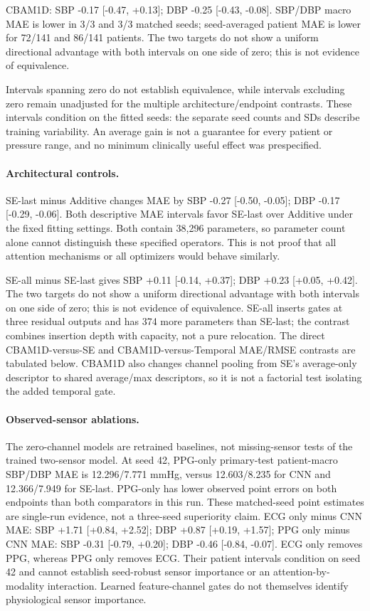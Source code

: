 \documentclass[11pt]{article}
\begin{document}
CBAM1D: SBP -0.17 [-0.47, +0.13]; DBP -0.25 [-0.43, -0.08]. SBP/DBP macro MAE is lower in 3/3 and 3/3 matched seeds; seed-averaged patient MAE is lower for 72/141 and 86/141 patients. The two targets do not show a uniform directional advantage with both intervals on one side of zero; this is not evidence of equivalence.

Intervals spanning zero do not establish equivalence, while intervals excluding zero remain unadjusted for the multiple architecture/endpoint contrasts. These intervals condition on the fitted seeds: the separate seed counts and SDs describe training variability. An average gain is not a guarantee for every patient or pressure range, and no minimum clinically useful effect was prespecified.

\paragraph{Architectural controls.}

SE-last minus Additive changes MAE by SBP -0.27 [-0.50, -0.05]; DBP -0.17 [-0.29, -0.06]. Both descriptive MAE intervals favor SE-last over Additive under the fixed fitting settings. Both contain 38,296 parameters, so parameter count alone cannot distinguish these specified operators. This is not proof that all attention mechanisms or all optimizers would behave similarly.

SE-all minus SE-last gives SBP +0.11 [-0.14, +0.37]; DBP +0.23 [+0.05, +0.42]. The two targets do not show a uniform directional advantage with both intervals on one side of zero; this is not evidence of equivalence. SE-all inserts gates at three residual outputs and has 374 more parameters than SE-last; the contrast combines insertion depth with capacity, not a pure relocation. The direct CBAM1D-versus-SE and CBAM1D-versus-Temporal MAE/RMSE contrasts are tabulated below. CBAM1D also changes channel pooling from SE's average-only descriptor to shared average/max descriptors, so it is not a factorial test isolating the added temporal gate.

\paragraph{Observed-sensor ablations.}

The zero-channel models are retrained baselines, not missing-sensor tests of the trained two-sensor model. At seed 42, PPG-only primary-test patient-macro SBP/DBP MAE is 12.296/7.771 mmHg, versus 12.603/8.235 for CNN and 12.366/7.949 for SE-last. PPG-only has lower observed point errors on both endpoints than both comparators in this run. These matched-seed point estimates are single-run evidence, not a three-seed superiority claim. ECG only minus CNN MAE: SBP +1.71 [+0.84, +2.52]; DBP +0.87 [+0.19, +1.57]; PPG only minus CNN MAE: SBP -0.31 [-0.79, +0.20]; DBP -0.46 [-0.84, -0.07]. ECG only removes PPG, whereas PPG only removes ECG. Their patient intervals condition on seed 42 and cannot establish seed-robust sensor importance or an attention-by-modality interaction. Learned feature-channel gates do not themselves identify physiological sensor importance.
\end{document}
